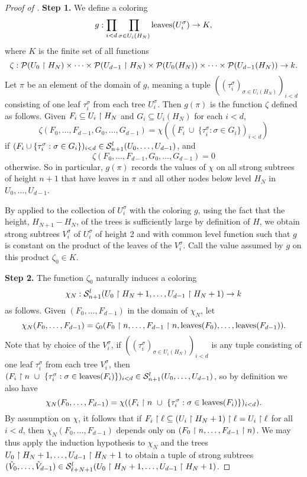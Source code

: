 \begin{proof}[Proof of ]
  \construction
  
  \medskip
  \noindent \textbf{Step 1.} We define a coloring
  \[
  	g:\prod_{i<d}\prod_{\sigma\in U_i(H_N)}\operatorname{leaves}({U_i^\sigma})\to K,
  \]
  where $K$ is the finite set of all functions
  \[
  	\zeta: \mathcal{P}(U_0 \upharpoonright H_N) \times \cdots \times \mathcal{P}(U_{d-1} \upharpoonright H_N) \times \mathcal{P}(U_0(H_N)) \times \cdots \times \mathcal{P}(U_{d-1}(H_N)) \to k.
  \]
  Let $\pi$ be an element of the domain of $g$, meaning a tuple $((\tau_i^\sigma)_{\sigma\in U_i(H_N)})_{i<d}$ consisting of one leaf $\tau^\sigma_i$ from each tree $U_i^\sigma$. Then $g(\pi)$ is the function $\zeta$ defined as follows. Given $F_i \subseteq U_i \upharpoonright H_N$ and $G_i \subseteq U_i(H_N)$ for each $i < d$,
  \[
  	\zeta(F_0,\ldots,F_{d-1},G_0,\ldots,G_{d-1}) = \chi((F_i ~\cup~\{ \tau_i^\sigma: \sigma \in G_i\})_{i < d})
  \]
  if $(F_i \cup \{ \tau_i^\sigma: \sigma \in G_i\})_{i < d} \in \mathcal{S}^{l}_{n+1}({U_0,\ldots,U_{d-1}})$, and
  \[
  	\zeta(F_0,\ldots,F_{d-1},G_0,\ldots,G_{d-1}) = 0
  \]
  otherwise. So in particular, $g(\pi)$ records the values of $\chi$ on all strong subtrees of height $n+1$ that have leaves in $\pi$ and all other nodes below level $H_N$ in $U_0,\ldots,U_{d-1}$.

  By  applied to the collection of $U_i^\sigma$ with the coloring $g$, using the fact that the height, $H_{N+1}-H_N$, of the trees is sufficiently large by definition of $H$, we obtain strong subtrees $V_i^\sigma$ of $U_i^\sigma$ of height 2 and with common level function such that $g$ is constant on the product of the leaves of the $V_i^\sigma$. Call the value assumed by $g$ on this product $\zeta_0 \in K$.
  
  \medskip
  \noindent \textbf{Step 2.} The function $\zeta_0$ naturally induces a coloring
  \[
  	\chi_N: \mathcal{S}^{l}_{n+1}({U_0 \upharpoonright H_N+1,\ldots,U_{d-1} \upharpoonright H_N+1}) \to k
  \]
  as follows. Given $(F_0,\ldots,F_{d-1})$ in the domain of $\chi_N$, let
  \[
  	\chi_N(F_0,\ldots,F_{d-1}) = \zeta_0(F_0 \upharpoonright n,\ldots,F_{d-1} \upharpoonright n,\operatorname{leaves}(F_0),\ldots,\operatorname{leaves}(F_{d-1})).
  \]
  Note that by choice of the $V^\sigma_i$, if $((\tau_i^\sigma)_{\sigma\in U_i(H_N)})_{i<d}$ is any tuple consisting of one leaf $\tau^\sigma_i$ from each tree $V_i^\sigma$, then $(F_i \upharpoonright n~\cup~\{ \tau_i^\sigma: \sigma \in \operatorname{leaves}(F_i)\})_{i < d} \in \mathcal{S}^{l}_{n+1}({U_0,\ldots,U_{d-1}})$, so by definition we also have
  \[
  	\chi_N(F_0,\ldots,F_{d-1}) = \chi((F_i \upharpoonright n~\cup~\{ \tau_i^\sigma: \sigma \in \operatorname{leaves}(F_i)\})_{i < d}).
  \]
  By assumption on $\chi$, it follows that if $F_i \upharpoonright \ell \subseteq (U_i \upharpoonright H_N +1) \upharpoonright \ell = U_i \upharpoonright \ell$ for all $i < d$, then $\chi_N(F_0,\ldots,F_{d-1})$ depends only on $(F_0 \upharpoonright n,\ldots,F_{d-1} \upharpoonright n)$. We may thus apply the induction hypothesis to $\chi_N$ and the trees $U_0 \upharpoonright H_N+1,\ldots,U_{d-1} \upharpoonright H_N+1$ to obtain a tuple of strong subtrees $(\hat V_0,\dots, \hat V_{d-1}) \in \mathcal{S}^{l}_{\ell + N+ 1}({U_0 \upharpoonright H_N+1,\ldots,U_{d-1} \upharpoonright H_N+1})$.
  

\end{proof}
